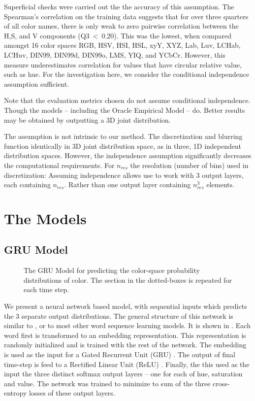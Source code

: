 \documentclass[11pt,letterpaper]{article}
\newcommand{\parencite}{\cite}
\begin{document}
Superficial checks were carried out the the accuracy of this assumption.
The Spearman's correlation on the training data suggests that for over three quarters of all color names, there is only weak to zero pairwise correlation between the H,S, and V components (\mbox{Q3 < 0.20}).
This was the lowest, when compared amongst 16 color spaces RGB, HSV, HSI, HSL, xyY, XYZ, Lab, Luv, LCHab, LCHuv, DIN99, DIN99d, DIN99o, LMS, YIQ, and YCbCr.
However, this measure underestimates correlation for values that have circular relative value, such as hue.
For the investigation here, we consider the conditional independence assumption sufficient.



Note that the evaluation metrics chosen do not assume conditional independence.
Though the models -- including the Oracle Empirical Model -- do.
Better results may be obtained by outputting a 3D joint distribution.

The assumption is not intrinsic to our method.
The discretization and blurring function identically in 3D joint distribution space,
as in three, 1D independent distribution spaces.
However, the independence assumption significantly decreases the computational requirements.
For $n_{res}$ the resolution (number of bins) used in discretization:
Assuming independence allows use to work with 3 output layers, each containing $n_{res}$.
Rather than one output layer containing $n_{res}^3$ elements.


\section{The Models}

\subsection{GRU Model}

\begin{figure}
	\resizebox{\columnwidth}{!}{	}

	\caption{\label{network}
		The GRU Model for predicting the color-space probability distributions of color.
		The section in the dotted-boxes is repeated for each time step.
		}
\end{figure}

We present a neural network based model, with sequential inputs which predicts the 3 separate output distributions. The general structure of this network is similar to \cite{2016arXiv160603821M}, or to most other word sequence learning models.
It is shown in .
Each word first is transformed to an embedding representation.
This representation is randomly initialized and is trained with the rest of the network.
The embedding is used as the input for a Gated Recurrent Unit (GRU) \parencite{cho2014properties,chung2014empirical}.
The output of final time-step is feed to a Rectified Linear Unit (ReLU) \parencite{dahl2013reludropout}.
Finally, the this used as the input the three distinct softmax output layers -- one for each of hue, saturation and value.
The network was trained to minimize to sum of the three cross-entropy losses of these output layers.
\end{document}
